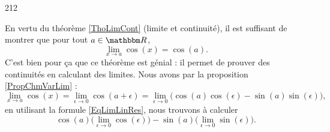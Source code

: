 

\begin{corrige}{212}

En vertu du théorème \ref{ThoLimCont}  (limite et continuité), il est suffisant de montrer que pour tout $a\in\eR$,
\[ 
  \lim_{x\to a}\cos(x)=\cos(a).
\]
C'est bien pour ça que ce théorème est génial : il permet de prouver des continuités en calculant des limites. Nous avons par la proposition \ref{PropChmVarLim} :
\begin{equation}
\lim_{x\to a}\cos(x)=\lim_{\epsilon\to 0}\cos(a+\epsilon)=\lim_{\epsilon\to0}\Big( \cos(a)\cos(\epsilon)-\sin(a)\sin(\epsilon) \Big),
\end{equation}
en utilisant la formule \eqref{EqLimLinRes}, nous trouvons à calculer
\[ 
  \cos(a)\Big(\lim_{\epsilon\to 0}\cos(\epsilon)\Big)-\sin(a)\Big( \lim_{\epsilon\to 0}\sin(\epsilon)\Big).
\]
\end{corrige}

